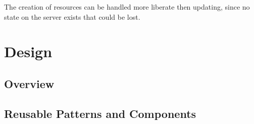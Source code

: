 \documentclass[12pt,a4paper,twoside]{scrartcl}		%
\newcommand{\citeurl}[2]{\url{#1} (#2)}
\begin{document}
The creation of resources can be handled more liberate then updating, since no
state on the server exists that could be lost.

\section{Design}






\subsection{Overview}

\subsection{Reusable Patterns and Components}


\end{document}
